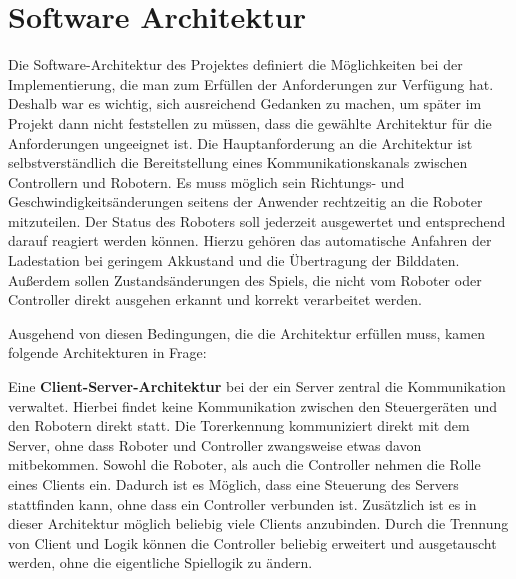 \chapter{Software Architektur}
\label{sec:software-architektur}

Die Software-Architektur des Projektes definiert die Möglichkeiten bei der Implementierung, die man zum Erfüllen der Anforderungen zur Verfügung hat. Deshalb war es wichtig, sich ausreichend Gedanken zu machen, um später im Projekt dann nicht feststellen zu müssen, dass die gewählte Architektur für die Anforderungen ungeeignet ist. Die Hauptanforderung an die Architektur ist selbstverständlich die Bereitstellung eines Kommunikationskanals zwischen Controllern und Robotern. Es muss möglich sein Richtungs- und Geschwindigkeitsänderungen seitens der Anwender rechtzeitig an die Roboter mitzuteilen. Der Status des Roboters soll jederzeit ausgewertet und entsprechend darauf reagiert werden können. Hierzu gehören das automatische Anfahren der Ladestation bei geringem Akkustand und die Übertragung der Bilddaten. Außerdem sollen Zustandsänderungen des Spiels, die nicht vom Roboter oder Controller direkt ausgehen erkannt und korrekt verarbeitet werden. 

Ausgehend von diesen Bedingungen, die die Architektur erfüllen muss, kamen folgende Architekturen in Frage:

Eine \textbf{Client-Server-Architektur} bei der ein Server zentral die Kommunikation verwaltet. Hierbei findet keine Kommunikation zwischen den Steuergeräten und den Robotern direkt statt. Die Torerkennung kommuniziert direkt mit dem Server, ohne dass Roboter und Controller zwangsweise etwas davon mitbekommen. Sowohl die Roboter, als auch die Controller nehmen die Rolle eines Clients ein. Dadurch ist es Möglich, dass eine Steuerung des Servers stattfinden kann, ohne dass ein Controller verbunden ist. Zusätzlich ist es in dieser Architektur möglich beliebig viele Clients anzubinden. Durch die Trennung von Client und Logik können die Controller beliebig erweitert und ausgetauscht werden, ohne die eigentliche Spiellogik zu ändern.


